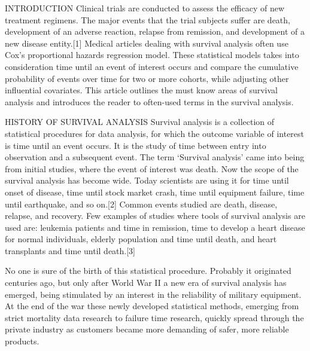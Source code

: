 INTRODUCTION
Clinical trials are conducted to assess the efficacy of new treatment regimens. The major events that the trial subjects suffer are death, development of an adverse reaction, relapse from remission, and development of a new disease entity.[1] Medical articles dealing with survival analysis often use Cox's proportional hazards regression model. These statistical models takes into consideration time until an event of interest occurs and compare the cumulative probability of events over time for two or more cohorts, while adjusting other influential covariates. This article outlines the must know areas of survival analysis and introduces the reader to often-used terms in the survival analysis.


HISTORY OF SURVIVAL ANALYSIS
Survival analysis is a collection of statistical procedures for data analysis, for which the outcome variable of interest is time until an event occurs. It is the study of time between entry into observation and a subsequent event. The term ‘Survival analysis’ came into being from initial studies, where the event of interest was death. Now the scope of the survival analysis has become wide. Today scientists are using it for time until onset of disease, time until stock market crash, time until equipment failure, time until earthquake, and so on.[2] Common events studied are death, disease, relapse, and recovery. Few examples of studies where tools of survival analysis are used are: leukemia patients and time in remission, time to develop a heart disease for normal individuals, elderly population and time until death, and heart transplants and time until death.[3]

No one is sure of the birth of this statistical procedure. Probably it originated centuries ago, but only after World War II a new era of survival analysis has emerged, being stimulated by an interest in the reliability of military equipment. At the end of the war these newly developed statistical methods, emerging from strict mortality data research to failure time research, quickly spread through the private industry as customers became more demanding of safer, more reliable products.

